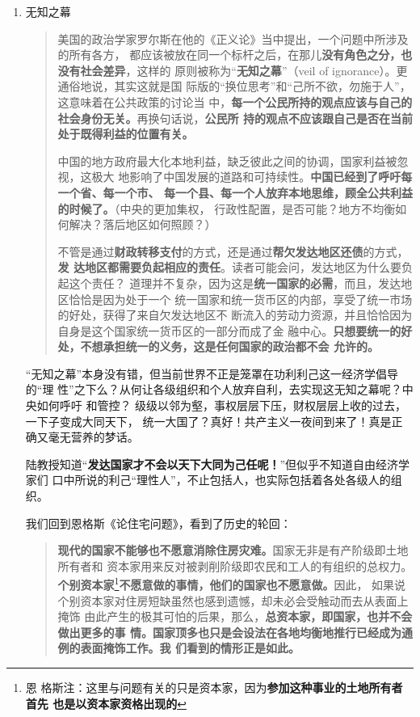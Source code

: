 \begin{enumerate}

\item 无知之幕

  \begin{quotation}
    美国的政治学家罗尔斯在他的《正义论》当中提出，一个问题中所涉及的所有各方，
    都应该被放在同一个标杆之后，在那儿\textbf{没有角色之分，也没有社会差异}，这样的
    原则被称为“\textbf{无知之幕}”（veil of ignorance）。更通俗地说，其实这就是国
    际版的“换位思考”和“己所不欲，勿施于人”，这意味着在公共政策的讨论当
    中，\textbf{每一个公民所持的观点应该与自己的社会身份无关。}再换句话说，\textbf{公民所
      持的观点不应该跟自己是否在当前处于既得利益的位置有关。}


    中国的地方政府最大化本地利益，缺乏彼此之间的协调，国家利益被忽视，这极大
    地影响了中国发展的道路和可持续性。\textbf{中国已经到了呼吁每一个省、每一个市、
      每一个县、每一个人放弃本地思维，顾全公共利益的时候了。}（中央的更加集权，
    行政性配置，是否可能？地方不均衡如何解决？落后地区如何照顾？）


    不管是通过\textbf{财政转移支付}的方式，还是通过\textbf{帮欠发达地区还债}的方式，\textbf{发
      达地区都需要负起相应的责任}。读者可能会问，发达地区为什么要负起这个责任？
    道理并不复杂，因为这是\textbf{统一国家的必需}，而且，发达地区恰恰是因为处于一个
    统一国家和统一货币区的内部，享受了统一市场的好处，获得了来自欠发达地区不
    断流入的劳动力资源，并且恰恰因为自身是这个国家统一货币区的一部分而成了金
    融中心。\textbf{只想要统一的好处，不想承担统一的义务，这是任何国家的政治都不会
      允许的。}
  \end{quotation}

  “无知之幕”本身没有错，但当前世界不正是笼罩在功利利己这一经济学倡导的“理
  性”之下么？从何让各级组织和个人放弃自利，去实现这无知之幕呢？中央如何呼吁
  和管控？ 级级以邻为壑，事权层层下压，财权层层上收的过去，一下子变成大同天下，
  统一大国了？真好！共产主义一夜间到来了！真是正确又毫无营养的梦话。

  陆教授知道“\textbf{发达国家才不会以天下大同为己任呢！}”但似乎不知道自由经济学家们
  口中所说的利己“理性人”，不止包括人，也实际包括着各处各级人的组织。

  我们回到恩格斯《论住宅问题》，看到了历史的轮回：

  \begin{quotation}
    \textbf{现代的国家不能够也不愿意消除住房灾难。}国家无非是有产阶级即土地所有者和
    资本家用来反对被剥削阶级即农民和工人的有组织的总权力。\textbf{个别资本家}\footnote{恩
      格斯注：这里与问题有关的只是资本家，因为\textbf{参加这种事业的土地所有者首先
        也是以资本家资格出现的}}\textbf{不愿意做的事情，他们的国家也不愿意做。}因此，
    如果说个别资本家对住房短缺虽然也感到遗憾，却未必会受触动而去从表面上掩饰
    由此产生的极其可怕的后果，那么，\textbf{总资本家，即国家，也并不会做出更多的事
      情。国家顶多也只是会设法在各地均衡地推行已经成为通例的表面掩饰工作。我
      们看到的情形正是如此。}
  \end{quotation}


\end{enumerate}
